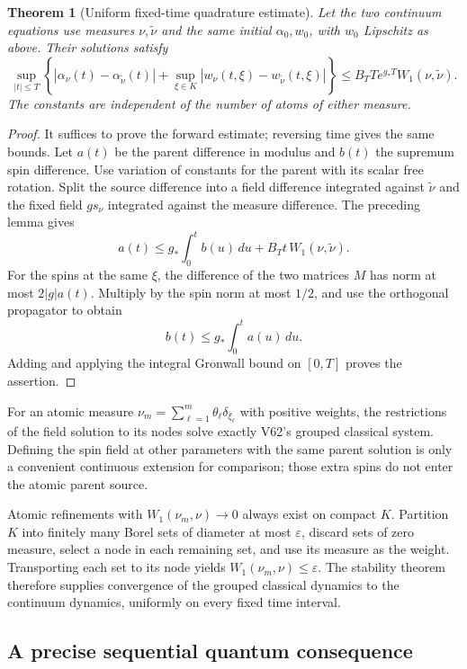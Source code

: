 \documentclass[11pt]{article}
\newtheorem{theorem}{Theorem}[section]
\theoremstyle{remark}
\begin{document}
\begin{theorem}[Uniform fixed-time quadrature estimate]
\label{thm:v20v63-stability}
Let the two continuum equations use measures
\(\nu,\widetilde\nu\) and the same initial
\(\alpha_0,w_0\), with \(w_0\) Lipschitz as above.
Their solutions satisfy
\[
 \sup_{|t|\leq T}
 \left\{|\alpha_\nu(t)-\alpha_{\widetilde\nu}(t)|
       +\sup_{\xi\in K}|w_\nu(t,\xi)-w_{\widetilde\nu}(t,\xi)|\right\}
 \leq B_T T e^{g_*T}W_1(\nu,\widetilde\nu).
\]
The constants are independent of the number of atoms of either
measure.
\end{theorem}
\begin{proof}
It suffices to prove the forward estimate; reversing time
gives the same bounds.  Let \(a(t)\) be the parent difference
in modulus and \(b(t)\) the supremum spin difference.
Use variation of constants for the parent with its scalar
free rotation.  Split the source difference into a field
difference integrated against \(\widetilde\nu\) and the
fixed field \(g s_\nu\) integrated against the measure
difference.  The preceding lemma gives
\[
 a(t)\leq g_*\int_0^t b(u)\,du+
                           B_Tt\,W_1(\nu,\widetilde\nu).
\]
For the spins at the same \(\xi\), the difference of
the two matrices \(M\) has norm at most \(2|g|a(t)\).
Multiply by the spin norm at most \(1/2\), and use the
orthogonal propagator to obtain
\[
 b(t)\leq g_*\int_0^t a(u)\,du.
\]
Adding and applying the integral Gronwall bound on
\([0,T]\) proves the assertion.
\end{proof}

For an atomic measure
\(\nu_m=\sum_{\ell=1}^{m}\theta_\ell\delta_{\xi_\ell}\)
with positive weights, the restrictions of the field
solution to its nodes solve exactly V62's grouped
classical system.  Defining the spin field at other
parameters with the same parent solution is only a
convenient continuous extension for comparison; those
extra spins do not enter the atomic parent source.

Atomic refinements with \(W_1(\nu_m,\nu)\to0\) always
exist on compact \(K\).  Partition \(K\) into finitely
many Borel sets of diameter at most \(\varepsilon\),
discard sets of zero measure, select a node in each
remaining set, and use its measure as the weight.
Transporting each set to its node yields
\(W_1(\nu_m,\nu)\leq\varepsilon\).
The stability theorem therefore supplies convergence
of the grouped classical dynamics to the continuum
dynamics, uniformly on every fixed time interval.

\subsection{A precise sequential quantum consequence}
\end{document}
